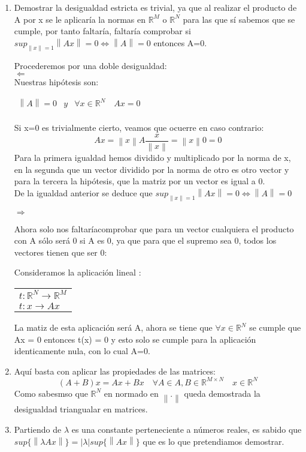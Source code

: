 \documentclass[a4paper , 11pt, spanish ]{article}
\newcommand{\norm}[1]{\left\lVert#1\right\rVert}
\begin{document}
\begin{enumerate}
\item Demostrar la desigualdad estricta es trivial, ya que al realizar el producto de A por x se le aplicaría la normas en $\mathbb{R}^{ M}$ o $\mathbb{R}^{ N }$ para las que sí sabemos que se cumple, por tanto faltaría, faltaría comprobar si $ sup_{\norm{x}=1} \norm{Ax} = 0 \Leftrightarrow \norm{A}=0 $  entonces A=0.
\par
Procederemos por una doble desigualdad: 
\\ $\Leftarrow$
\\ Nuestras hipótesis son: 
\par 
\centering
$\begin{matrix}
	\norm{A} = 0 & y &\forall x \in \mathbb{R}^{N} \quad  Ax=0 \\
\end{matrix}$
\flushleft 
\par  
Si x=0 es trivialmente cierto, veamos que ocuerre en caso contrario: \\
$$ Ax = \norm{x} A \frac{x}{\norm{x}} = \norm{x}0 = 0$$  
Para la primera igualdad hemos dividido y multiplicado por la norma de x, en la segunda que un vector dividido por la norma de otro es otro vector y para la tercera la hipótesis, que la matriz por un vector es igual a 0. 
\\ De la igualdad anterior se deduce que $ sup_{\norm{x}=1} \norm{Ax} = 0 \Leftrightarrow \norm{A}=0 $

\par 
$\Rightarrow$
\par
Ahora solo nos faltaríacomprobar que para un vector cualquiera el producto con A sólo será 0 si A es 0, ya que para que el supremo sea 0, todos los vectores tienen que ser 0:

Consideramos la aplicación lineal :\\
\begin{tabular}{l}
	$t:  \mathbb{R}^{ N } \longrightarrow   \mathbb{R}^{M} $ \\
	$t: x \longrightarrow Ax $
\end{tabular}


 
La matiz de esta aplicación será A, ahora se tiene que $\forall x \in \mathbb{R}^{N} $ se cumple que  Ax = 0 entonces t(x) = 0 y esto solo se cumple para la aplicación identicamente nula, con lo cual A=0.  

\item Aquí basta con aplicar las propiedades de las matrices: 
$$ (A + B)x = Ax + Bx \quad \forall A \in A,B \in \mathbb{R}^{M \times N}  \quad x \in \mathbb{R}^{N}$$ 
Como sabesmso que $\mathbb{R}^{N}$ en normado en $\norm{.}$ queda demostrada la desigualdad triangualar en matrices. 

\item Partiendo de $\lambda$ es una constante perteneciente a números reales, es sabido que  $ sup \{ \norm{ \lambda Ax } \} =  |\lambda | sup\{\norm{Ax} \}$ que es lo que pretendiamos demostrar.  

\end{enumerate} 
\end{document}
